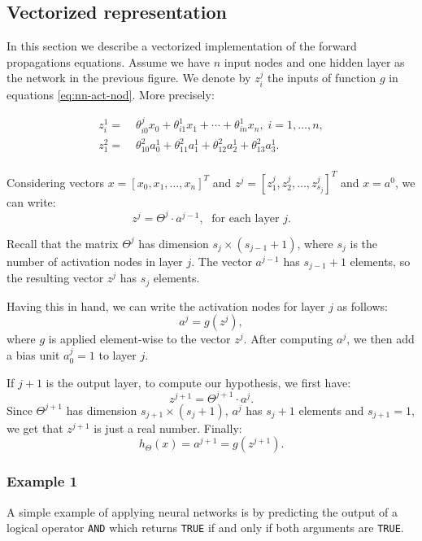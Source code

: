 \documentclass[a4paper,11pt]{report}
\begin{document}
\subsection*{Vectorized representation}

In this section we describe a vectorized implementation of the forward propagations equations.
Assume we have $n$ input nodes and one hidden layer as the network in the previous figure. We denote by $z^j_i$ the inputs of function $g$ in equations \eqref{eq:nn-act-nod}. More precisely:

\begin{equation}\label{eq:nn-def-z's}
\begin{split}
z_i^{1} = & \; \theta_{i0}^{j}x_0 + \theta_{i1}^{1}x_1 + \cdots + \theta_{in}^{1}x_n,\; i=1,\ldots,n, \\
z_1^{2} = & \; \theta_{10}^{2}a_0^{1} + \theta_{11}^{2}a_1^{1} + \theta_{12}^{2}a_2^{1} + \theta_{13}^{2}a_3^{1}. \\
\end{split}
\end{equation}

Considering vectors $x = [x_0, x_1, \ldots, x_n]^T$ and $z^j = [z^j_1, z^j_2, \ldots, z^{j}_{s_j}]^T$  and $x = a^0$, we can write: $$z^{j} = \Theta^{j} \cdot a^{j-1}, \; \text{ for each layer } j.$$

Recall that the matrix $\Theta^j$ has dimension $s_{j}\times (s_{j-1}+1)$, where $s_j$ is the number of activation nodes in layer $j$. The vector $a^{j-1}$ has $s_{j-1}+1$ elements, so the resulting vector $z^{j}$ has $s_j$ elements.

Having this in hand, we can write the activation nodes for layer $j$ as follows: $$a^{j} = g(z^{j}),$$ where $g$ is applied element-wise to the vector $z^{j}$. After computing $a^{j}$, we then add a bias unit $a_0^{j} = 1$ to layer $j$.

If $j+1$ is the output layer, to compute our hypothesis, we first have: $$z^{j+1}=\Theta^{j+1}\cdot a^j.$$
Since $\Theta^{j+1}$ has dimension $s_{j+1}\times (s_{j}+1)$, $a^j$ has $s_j + 1$ elements and $s_{j+1} = 1$, we get that $z^{j+1}$ is just a real number.
Finally: $$h_\Theta(x) = a^{j+1} = g(z^{j+1}).$$


\subsubsection*{Example 1}

A simple example of applying neural networks is by predicting the output of a logical operator \verb"AND" which returns \verb"TRUE" if and only if both arguments are \verb"TRUE".
\end{document}
